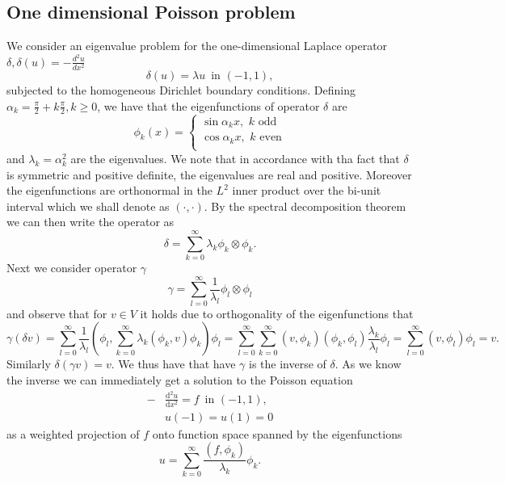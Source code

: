 \documentclass[a4paper,10pt]{article}
\newcommand{\inner}[2]{\ensuremath{\left(#1, #2\right)}}
\newcommand{\deriv}[2]{\ensuremath{\frac{\mathrm{d}#1}{\mathrm{d}#2}}}
\begin{document}
  \subsection{One dimensional Poisson problem}
  We consider an eigenvalue problem for the one-dimensional Laplace operator
  $\delta, \delta(u) = -\tfrac{d^2u}{dx^2}$
  \begin{equation}
  \label{eq:eig_pos1}
    \delta(u) = \lambda u \,\text{ in }(-1, 1),
  \end{equation}
  subjected to the homogeneous Dirichlet boundary conditions.
  Defining $\alpha_k = \frac{\pi}{2} + k\frac{\pi}{2}, k\geq0$, we have that the
  eigenfunctions of operator $\delta$ are
  \[
  \phi_k(x) = \begin{cases}
                \sin{\alpha_k x},\,\,k\,\,\text{odd}\\
                \cos{\alpha_k x},\,\,k\,\,\text{even}\\
              \end{cases}
  \]
  and $\lambda_k = \alpha_k^2$ are the eigenvalues. We note that in accordance
  with tha fact that $\delta$ is symmetric and positive definite, the eigenvalues
  are real and positive. Moreover the eigenfunctions are orthonormal in the $L^2$
  inner product over the bi-unit interval which we shall denote as
  $\inner{\cdot}{\cdot}$. By the spectral decomposition theorem
  we can then write the operator as
  \[
    \delta = \sum_{k=0}^{\infty} \lambda_k \phi_k \otimes \phi_k.
  \]
  Next we consider operator $\gamma$
  \[
    \gamma = \sum_{l=0}^{\infty} \frac{1}{\lambda_l} \phi_l \otimes \phi_l
  \]
  and observe that for $v\in V$ it holds due to orthogonality of the
  eigenfunctions that 
  \[
    \gamma\left(\delta v \right) = 
    \sum_{l=0}^{\infty} \frac{1}{\lambda_l}
    \inner{\phi_l}{\sum_{k=0}^{\infty} \lambda_k\inner{\phi_k}{v}\phi_k}\phi_l=
    \sum_{l=0}^{\infty}\sum_{k=0}^{\infty}\inner{v}{\phi_k}\inner{\phi_k}{\phi_l}\frac{\lambda_k}{\lambda_l}\phi_l =
    \sum_{l=0}^{\infty}\inner{v}{\phi_l}\phi_l = 
    v.
  \] 
  Similarly $\delta\left(\gamma v\right)=v$. We thus have that have $\gamma$ is
  the inverse of $\delta$. As we know the inverse we can immediately get a 
  solution to the Poisson equation
  \begin{equation}
  \label{eq:poisson_strong_1}
  \begin{aligned}
    -&\deriv{^2u}{x^2} = f\,\text{ in }(-1, 1),\\
     &u(-1) = u(1) = 0
  \end{aligned}
  \end{equation}
  as a weighted projection of $f$ onto function space spanned by the
  eigenfunctions
  \begin{equation}
  \label{eq:poisson_1d_sol}
  u = \sum_{k=0}^{\infty} \frac{\inner{f}{\phi_k}}{\lambda_k} \phi_k.
  \end{equation}
\end{document}

